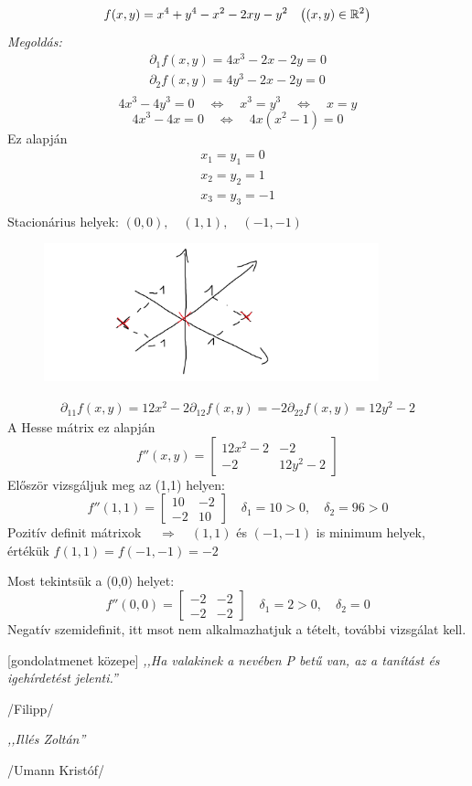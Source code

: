 \documentclass[a4paper,11.5pt]{article}
\begin{document}
	\begin{task}
		\[ f(x,y)=x^4+y^4-x^2-2xy-y^2\quad \big((x,y)\in\mathbb{R}^2\big) \]
		\textit{Megoldás:}
		\begin{align*}
			\partial_1f(x,y)=4x^3-2x-2y=0\\
			\partial_2f(x,y)=4y^3-2x-2y=0\\
		\end{align*}
		\[ 4x^3-4y^3=0\quad \Leftrightarrow\quad x^3=y^3\quad \Leftrightarrow\quad x=y \]
		\[ 4x^3-4x=0\quad \Leftrightarrow\quad 4x(x^2-1)=0 \]
		Ez alapján
		\begin{align*}
			x_1=y_1=0\\
			x_2=y_2=1\\
			x_3=y_3=-1\\
		\end{align*}
		Stacionárius helyek: $(0,0),\quad (1,1),\quad (-1,-1)$
		\begin{figure}[H]
			\centering
			\includegraphics[height=4cm]{kepek/40.png}
			\caption{}
		\end{figure}
		\begin{align*}
			\partial_{11}f(x,y)=12x^2-2
			\partial_{12}f(x,y)=-2
			\partial_{22}f(x,y)=12y^2-2
		\end{align*}
		A Hesse mátrix ez alapján
		\[ f''(x,y)=\begin{bmatrix}
			12x^2-2&-2\\
			-2&12y^2-2
		\end{bmatrix} \]
		Először vizsgáljuk meg az (1,1) helyen:
		\[ f''(1,1)=\begin{bmatrix}
			10&-2\\
			-2&10
		\end{bmatrix}\quad \delta_1=10>0,\quad \delta_2=96>0 \] 
		Pozitív definit mátrixok $\quad \Rightarrow\quad (1,1)$ és $(-1,-1)$ is minimum helyek, értékük $f(1,1)=f(-1,-1)=-2$
		
		Most tekintsük a (0,0) helyet:
		\[ f''(0,0)=\begin{bmatrix}
			-2&-2\\
			-2&-2
		\end{bmatrix}\quad \delta_1=2>0,\quad \delta_2=0 \]
		Negatív szemidefinit, itt msot nem alkalmazhatjuk a tételt, további vizsgálat kell.
		\begin{center}
			[gondolatmenet közepe]
			\textit{,,Ha valakinek a nevében P betű van, az a tanítást és igehírdetést jelenti.''}
			
			/Filipp/
			\medskip
			
			\textit{,,Illés Zoltán''}
			
			/Umann Kristóf/
		\end{center}
	\end{task}
\end{document}
